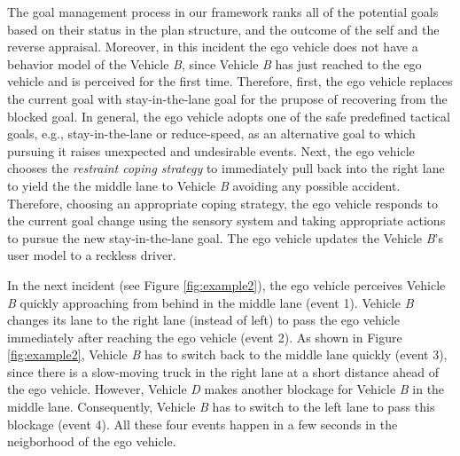 \documentclass[journal, 11pt]{IEEEtran}
\begin{document}
The goal management process in our framework ranks all of the potential goals
based on their status in the plan structure, and the outcome of the self and the
reverse appraisal. Moreover, in this incident the ego vehicle does not have a
behavior model of the Vehicle \textit{B}, since Vehicle \textit{B} has just
reached to the ego vehicle and is perceived for the first time. Therefore,
first, the ego vehicle replaces the current goal with stay-in-the-lane goal for
the prupose of recovering from the blocked goal. In general, the ego vehicle
adopts one of the safe predefined tactical goals, e.g., stay-in-the-lane or
reduce-speed, as an alternative goal to which pursuing it raises unexpected and
undesirable events. Next, the ego vehicle chooses the \textit{restraint coping
strategy} to immediately pull back into the right lane to yield the the middle
lane to Vehicle \textit{B} avoiding any possible accident. Therefore, choosing
an appropriate coping strategy, the ego vehicle responds to the current goal
change using the sensory system and taking appropriate actions to pursue the new
stay-in-the-lane goal. The ego vehicle updates the Vehicle \textit{B}'s user
model to a reckless driver.

In the next incident (see Figure \ref{fig:example2}), the ego vehicle perceives
Vehicle \textit{B} quickly approaching from behind in the middle lane (event 1).
Vehicle \textit{B} changes its lane to the right lane (instead of left) to pass
the ego vehicle immediately after reaching the ego vehicle (event 2). As
shown in Figure \ref{fig:example2}, Vehicle \textit{B} has to switch back to the
middle lane quickly (event 3), since there is a slow-moving truck in the right
lane at a short distance ahead of the ego vehicle. However, Vehicle \textit{D}
makes another blockage for Vehicle \textit{B} in the middle lane. Consequently,
Vehicle \textit{B} has to switch to the left lane to pass this blockage (event
4). All these four events happen in a few seconds in the neigborhood of the ego
vehicle.
\end{document}
